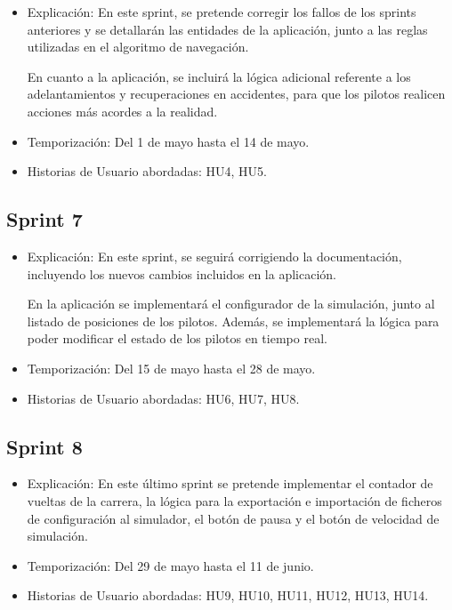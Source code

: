 \begin{itemize}
    \item Explicación: En este sprint, se pretende corregir los fallos de los sprints anteriores y se detallarán las entidades de la aplicación, junto a las reglas utilizadas en el algoritmo de navegación.
    
    En cuanto a la aplicación, se incluirá la lógica adicional referente a los adelantamientos y recuperaciones en accidentes, para que los pilotos realicen acciones más acordes a la realidad.
    

    \item Temporización: Del 1 de mayo hasta el 14 de mayo.
    \item Historias de Usuario abordadas: HU4, HU5.
\end{itemize}

\subsection{Sprint 7}

\begin{itemize}
    \item Explicación: En este sprint, se seguirá corrigiendo la documentación, incluyendo los nuevos cambios incluidos en la aplicación.
    
    En la aplicación se implementará el configurador de la simulación, junto al listado de posiciones de los pilotos. Además, se implementará la lógica para poder modificar el estado de los pilotos en tiempo real.
    
    \item Temporización: Del 15 de mayo hasta el 28 de mayo.
    \item Historias de Usuario abordadas: HU6, HU7, HU8.
\end{itemize}

\subsection{Sprint 8}

\begin{itemize}
    \item Explicación: En este último sprint se pretende implementar el contador de vueltas de la carrera, la lógica para la exportación e importación de ficheros de configuración al simulador, el botón de pausa y el botón de velocidad de simulación.
    \item Temporización: Del 29 de mayo hasta el 11 de junio.
    \item Historias de Usuario abordadas: HU9, HU10, HU11, HU12, HU13, HU14.
\end{itemize}


